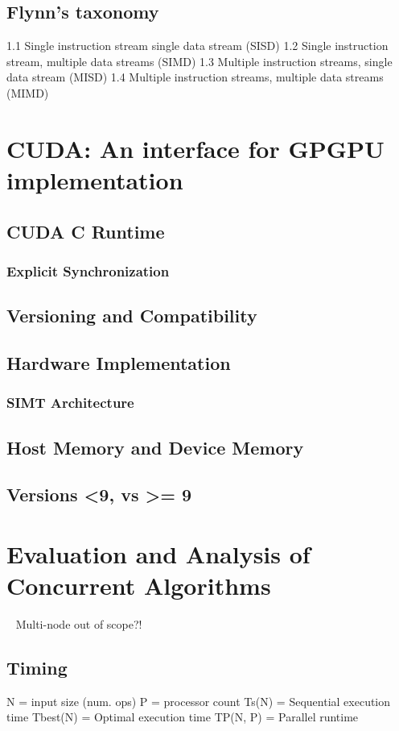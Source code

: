 \subsection{Flynn's taxonomy}
1.1	Single instruction stream single data stream (SISD)
1.2	Single instruction stream, multiple data streams (SIMD)
1.3	Multiple instruction streams, single data stream (MISD)
1.4	Multiple instruction streams, multiple data streams (MIMD)
%
\section{CUDA: An interface for GPGPU implementation}
\subsection{CUDA C Runtime}%
\subsubsection{Explicit Synchronization}%
\subsection{Versioning and Compatibility}%
\subsection{Hardware Implementation}%
\subsubsection{SIMT Architecture}%
\subsection{Host Memory and Device Memory}
\subsection{Versions <9, vs >= 9}
%
%
%
%
%
\section{Evaluation and Analysis of Concurrent Algorithms}~\cite[p.~330]{Lang17}
Multi-node out of scope?!
%
\subsection{Timing}
	N = input size (num. ops)
	P = processor count
	Ts(N) = Sequential execution time
	Tbest(N) = Optimal execution time
	TP(N, P) = Parallel runtime
%
